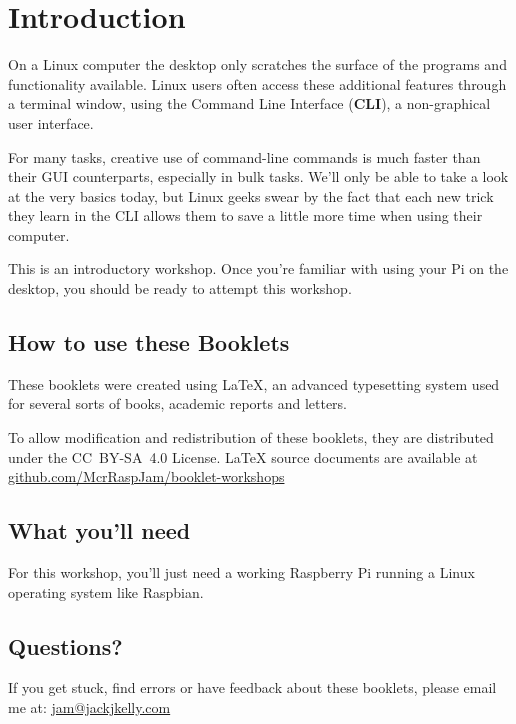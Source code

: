 \setcounter{section}{-1}
\section{Introduction}
	
	On a Linux computer the desktop only scratches the surface of the programs and functionality available. Linux users often access these additional features through a terminal window, using the Command Line Interface (\textbf{CLI}), a non-graphical user interface.
	
	For many tasks, creative use of command-line commands is much faster than their GUI counterparts, especially in bulk tasks.	We'll only be able to take a look at the very basics today, but Linux geeks swear by the fact that each new trick they learn in the CLI allows them to save a little more time when using their computer.

	This is an introductory workshop. Once you're familiar with using your Pi on the desktop, you should be ready to attempt this workshop.
		
	\subsection*{How to use these Booklets}

	
	
	
	
		
	These booklets were created using {\selectfont \LaTeX}, an advanced typesetting system used for several sorts of books, academic reports and letters.
		
	To allow modification and redistribution of these booklets, they are distributed under the \hbox{CC BY-SA 4.0} License. LaTeX source documents are available at \mbox{\href{http://github.com/McrRaspJam/booklet-workshops}{github.com/McrRaspJam/booklet-workshops}}
	
	
	\subsection*{What you'll need}
		
		For this workshop, you'll just need a working Raspberry Pi running a Linux operating system like Raspbian.
		
	\subsection*{Questions?}
		If you get stuck, find errors or have feedback about these booklets, please email me at:
		\mbox{\url{jam@jackjkelly.com}\label{email}}